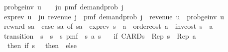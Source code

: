\begin{isabellebody}
\isamarkupfalse%
\ {\isachardoublequoteopen}prob{\isacharunderscore}{\kern0pt}ge{\isacharunderscore}{\kern0pt}inv\ u\ {\isacharequal}{\kern0pt}\ {}\ {\isacharminus}{\kern0pt}\ {\isacharparenleft}{\kern0pt}{\isasymSum}j{\isacharless}{\kern0pt}u{\isachardot}{\kern0pt}\ pmf\ demand{\isacharunderscore}{\kern0pt}prob\ j{\isacharparenright}{\kern0pt}{\isachardoublequoteclose}\isanewline
{}\isamarkupfalse%
\ {\isachardoublequoteopen}exp{\isacharunderscore}{\kern0pt}rev\ u\ {\isacharequal}{\kern0pt}\ {\isacharparenleft}{\kern0pt}{\isasymSum}j{\isacharless}{\kern0pt}u{\isachardot}{\kern0pt}\ revenue\ j\ {\isacharasterisk}{\kern0pt}\ pmf\ demand{\isacharunderscore}{\kern0pt}prob\ j{\isacharparenright}{\kern0pt}\ {\isacharplus}{\kern0pt}\ revenue\ u\ {\isacharasterisk}{\kern0pt}\ prob{\isacharunderscore}{\kern0pt}ge{\isacharunderscore}{\kern0pt}inv\ u{\isachardoublequoteclose}\isanewline
{}\isamarkupfalse%
\ {\isachardoublequoteopen}reward\ sa\ {\isacharequal}{\kern0pt}\ {\isacharparenleft}{\kern0pt}case\ sa\ of\ {\isacharparenleft}{\kern0pt}s{\isacharcomma}{\kern0pt}a{\isacharparenright}{\kern0pt}\ {\isasymRightarrow}\ exp{\isacharunderscore}{\kern0pt}rev\ {\isacharparenleft}{\kern0pt}s\ {\isacharplus}{\kern0pt}\ a{\isacharparenright}{\kern0pt}\ {\isacharminus}{\kern0pt}\ order{\isacharunderscore}{\kern0pt}cost\ a\ {\isacharminus}{\kern0pt}\ inv{\isacharunderscore}{\kern0pt}cost\ {\isacharparenleft}{\kern0pt}s\ {\isacharplus}{\kern0pt}\ a{\isacharparenright}{\kern0pt}{\isacharparenright}{\kern0pt}{\isachardoublequoteclose}\isanewline
{}\isamarkupfalse%
\ transition\ {\isacharcolon}{\kern0pt}{\isacharcolon}{\kern0pt}\ {\isachardoublequoteopen}{\isacharparenleft}{\kern0pt}{\isacharprime}{\kern0pt}s\ {\isasymtimes}\ {\isacharprime}{\kern0pt}s{\isacharparenright}{\kern0pt}\ {\isasymRightarrow}\ {\isacharprime}{\kern0pt}s\ pmf{\isachardoublequoteclose}\ \ {\isachardoublequoteopen}{\isasymlambda}{\isacharparenleft}{\kern0pt}s{\isacharcomma}{\kern0pt}\ a{\isacharparenright}{\kern0pt}\ s{\isacharprime}{\kern0pt}{\isachardot}{\kern0pt}\ \isanewline
\ \ {\isacharparenleft}{\kern0pt}if\ CARD{\isacharparenleft}{\kern0pt}{\isacharprime}{\kern0pt}s{\isacharparenright}{\kern0pt}\ {\isasymle}\ Rep\ s\ {\isacharplus}{\kern0pt}\ Rep\ a\ \isanewline
\ \ then\ {\isacharparenleft}{\kern0pt}if\ s{\isacharprime}{\kern0pt}\ {\isacharequal}{\kern0pt}\ {}\ then\ {}\ else\ {}{\isacharparenright}{\kern0pt}\isanewline

\end{isabellebody}
